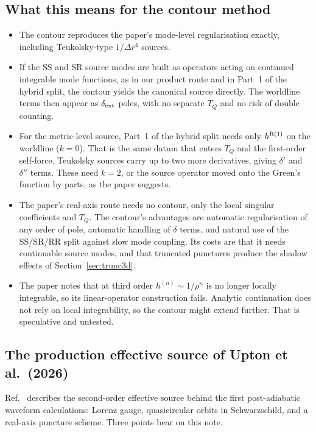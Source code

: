 \documentclass[11pt,a4paper]{article}
\newcommand{\dext}{\delta_{\rm ext}}
\begin{document}
\subsection{What this means for the contour method}
\begin{itemize}[nosep]
\item The contour reproduces the paper's mode-level regularisation exactly, including Teukolsky-type $1/\Delta r^4$ sources.
\item If the SS and SR source modes are built as operators acting on continued integrable mode functions, as in our product route and in Part~1 of the hybrid split, the contour yields the canonical source directly. The worldline terms then appear as $\dext$ poles, with no separate $T_Q$ and no risk of double counting.
\item For the metric-level source, Part~1 of the hybrid split needs only $h^{\rm R(1)}$ on the worldline ($k=0$). That is the same datum that enters $T_Q$ and the first-order self-force.
  Teukolsky sources carry up to two more derivatives, giving $\delta'$ and $\delta''$ terms. These need $k=2$, or the source operator moved onto the Green's function by parts, as the paper suggests.
\item The paper's real-axis route needs no contour, only the local singular coefficients and $T_Q$.
  The contour's advantages are automatic regularisation of any order of pole, automatic handling of $\delta$ terms, and natural use of the SS/SR/RR split against slow mode coupling.
  Its costs are that it needs continuable source modes, and that truncated punctures produce the shadow effects of Section~\ref{sec:trunc3d}.
\item The paper notes that at third order $h^{(n)}\sim1/\rho^n$ is no longer locally integrable, so its linear-operator construction fails.
  Analytic continuation does not rely on local integrability, so the contour might extend further. That is speculative and untested.
\end{itemize}

\subsection{The production effective source of Upton et al.\ (2026)}\label{sec:upton}
Ref.~\cite{Upton2026} describes the second-order effective source behind the first post-adiabatic waveform calculations: Lorenz gauge, quasicircular orbits in Schwarzschild, and a real-axis puncture scheme.
Three points bear on this note.
\end{document}
